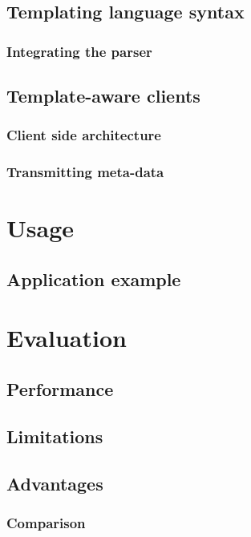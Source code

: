 \documentclass[twoside,11pt,openright]{report}
\begin{document}
\section{Templating language syntax}
\subsection{Integrating the parser}
\section{Template-aware clients}
\subsection{Client side architecture}
\subsection{Transmitting meta-data}


\chapter{Usage}
\section{Application example}


\chapter{Evaluation}
\section{Performance}
\section{Limitations}
\section{Advantages}
\subsection{Comparison}
\end{document}
